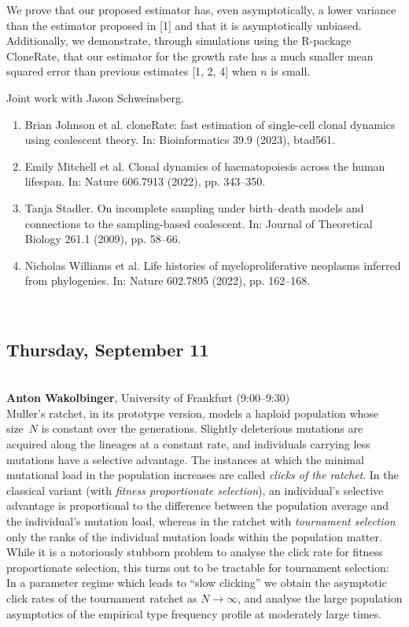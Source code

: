 \documentclass[12pt,a4paper]{article}
\begin{document}
 We prove that our proposed estimator has, even asymptotically, a lower variance than the estimator proposed in [1] and that it is asymptotically unbiased. Additionally, we demonstrate, through simulations using the R-package CloneRate, that our estimator for the growth rate has a much smaller mean squared error than previous estimates [1, 2, 4] when $n$ is small. 

 Joint work with Jason Schweinsberg. 

 \begin{enumerate} \item Brian Johnson et al. cloneRate: fast estimation of single-cell clonal dynamics using coalescent theory. In: Bioinformatics 39.9 (2023), btad561. \item Emily Mitchell et al. Clonal dynamics of haematopoiesis across the human lifespan. In: Nature 606.7913 (2022), pp. 343–350. \item Tanja Stadler. On incomplete sampling under birth–death models and connections to the sampling-based coalescent. In: Journal of Theoretical Biology 261.1 (2009), pp. 58–66. \item Nicholas Williams et al. Life histories of myeloproliferative neoplasms inferred from phylogenies. In: Nature 602.7895 (2022), pp. 162–168. \end{enumerate} \\
\bigskip\bigskip

\subsection*{\sffamily Thursday, September 11}
\bigskip\bigskip
{}\\[1ex]{ \large \textbf{ Anton Wakolbinger}}, University of Frankfurt (9:00--9:30) \\[2ex] Muller's ratchet, in its prototype version, models a haploid population whose size~$N$ is constant over the generations. Slightly deleterious mutations are acquired along the lineages at a constant rate, and individuals carrying less mutations have a selective advantage. The instances at which the minimal mutational load in the population increases are called {\em clicks of the ratchet}.  In the classical variant (with {\em fitness proportionate selection}), an individual's selective advantage is proportional to the difference between the population average and the individual's mutation load, whereas in the ratchet with {\em  tournament selection}  only the ranks of the  individual mutation loads within the population matter. While it is a notoriously stubborn problem to analyse the click rate for fitness proportionate selection, this turns out to be tractable for tournament selection:   In a parameter regime which leads to ``slow clicking'' we obtain the  asymptotic click rates of the tournament ratchet as $N\to \infty$, and analyse the large population asymptotics of the empirical type frequency profile at moderately large times. 
\end{document}
